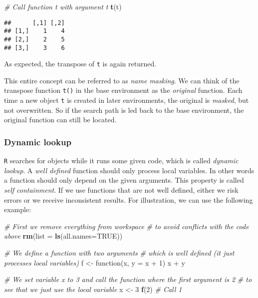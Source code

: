 \documentclass[11,]{article}
\newenvironment{Shaded}{\begin{snugshade}}{\end{snugshade}}
\newcommand{\KeywordTok}[1]{\textcolor[rgb]{0.13,0.29,0.53}{\textbf{{#1}}}}
\newcommand{\DataTypeTok}[1]{\textcolor[rgb]{0.13,0.29,0.53}{{#1}}}
\newcommand{\DecValTok}[1]{\textcolor[rgb]{0.00,0.00,0.81}{{#1}}}
\newcommand{\StringTok}[1]{\textcolor[rgb]{0.31,0.60,0.02}{{#1}}}
\newcommand{\CommentTok}[1]{\textcolor[rgb]{0.56,0.35,0.01}{\textit{{#1}}}}
\newcommand{\OtherTok}[1]{\textcolor[rgb]{0.56,0.35,0.01}{{#1}}}
\newcommand{\NormalTok}[1]{{#1}}
\begin{document}
\begin{Shaded}
\begin{Highlighting}[]
\CommentTok{# Call function t with argument t}
\KeywordTok{t}\NormalTok{(t)}
\end{Highlighting}
\end{Shaded}

\begin{verbatim}
##      [,1] [,2]
## [1,]    1    4
## [2,]    2    5
## [3,]    3    6
\end{verbatim}

As expected, the transpose of \texttt{t} is again returned.

This entire concept can be referred to as \emph{name masking}. We can
think of the transpose function \texttt{t()} in the base environment as
the \emph{original} function. Each time a new object \texttt{t} is
created in later environments, the original is \emph{masked}, but not
overwritten. So if the search path is led back to the base environment,
the original function can still be located.

\subsubsection{Dynamic lookup}\label{dynamic-lookup}

\texttt{R} searches for objects while it runs some given code, which is
called \emph{dynamic lookup}. A \emph{well defined} function should only
process local variables. In other words a function should only depend on
the given arguments. This property is called \emph{self containment}. If
we use functions that are not well defined, either we risk errors or we
receive inconsistent results. For illustration, we can use the following
example:

\begin{Shaded}
\begin{Highlighting}[]
\CommentTok{# First we remove everything from workspace}
\CommentTok{# to avoid conflicts with the code above}
\KeywordTok{rm}\NormalTok{(}\DataTypeTok{list =} \KeywordTok{ls}\NormalTok{(}\DataTypeTok{all.names=}\OtherTok{TRUE}\NormalTok{))}

\CommentTok{# We define a function with two arguments}
\CommentTok{# which is well defined (it just processes local variables)}
\NormalTok{f <-}\StringTok{ }\NormalTok{function(x, }\DataTypeTok{y =} \NormalTok{x +}\StringTok{ }\DecValTok{1}\NormalTok{) x +}\StringTok{ }\NormalTok{y}

\CommentTok{# We set variable x to 3 and call the function where the first argument is 2}
\CommentTok{# to see that we just use the local variable}
\NormalTok{x <-}\StringTok{ }\DecValTok{3}
\KeywordTok{f}\NormalTok{(}\DecValTok{2}\NormalTok{)  }\CommentTok{# Call 1}
\end{Highlighting}
\end{Shaded}
\end{document}
